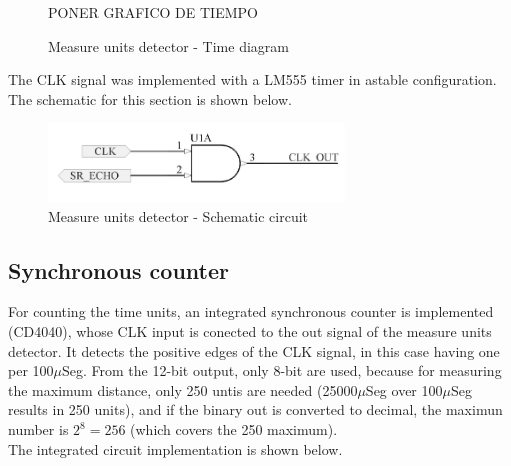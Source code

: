 \begin{figure}[H]
    \begin{centering}
        PONER GRAFICO DE TIEMPO
    \par\end{centering}
    \caption{Measure units detector - Time diagram}
\end{figure}

The CLK signal was implemented with a LM555 timer in astable configuration.
The schematic for this section is shown below.

\begin{figure}[H]
    \begin{centering}
    \includegraphics[width=0.7\textwidth]{Unit_Detector}
    \par\end{centering}
    \caption{Measure units detector - Schematic circuit}
\end{figure}

\subsection*{Synchronous counter}

For counting the time units, an integrated synchronous counter is implemented (CD4040), 
whose CLK input is conected to the out signal of the measure units detector. It detects the 
positive edges of the CLK signal, in this case having one per 100$\mu$Seg. From the 12-bit 
output, only 8-bit are used, because for measuring the maximum distance, only 250 untis are 
needed (25000$\mu$Seg over 100$\mu$Seg results in 250 units), and if the binary out is converted 
to decimal, the maximun number is $2^8 = 256$ (which covers the 250 maximum).\\
The integrated circuit implementation is shown below.


